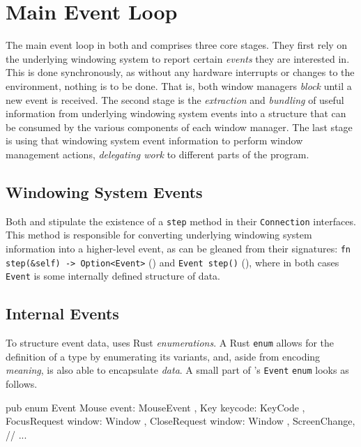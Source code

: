 \section{Main Event Loop}

The main event loop  in both \wmrs and \wmcpp comprises  three core stages. They
first rely on the underlying  windowing system to report certain \textit{events}
they are  interested in.  This is  done synchronously,  as without  any hardware
interrupts or changes to  the environment, nothing is to be  done. That is, both
window managers \textit{block}  until a new event is received.  The second stage
is  the \textit{extraction}  and  \textit{bundling} of  useful information  from
underlying windowing system events into a  structure that can be consumed by the
various  components  of each  window  manager.  The  last  stage is  using  that
windowing  system  event  information  to  perform  window  management  actions,
\textit{delegating work} to different parts of the program.

\subsection{Windowing System Events}

Both  \wmrs  and  \wmcpp  stipulate  the existence  of  a  \texttt{step}  method
in  their  \texttt{Connection}  interfaces.   This  method  is  responsible  for
converting underlying windowing system information into a higher-level event, as
can  be  gleaned  from  their signatures:  \texttt{fn  step(&self)  ->
Option<Event>}  (\wmrs) and  \texttt{Event step()}  (\wmcpp), where  in
both cases \texttt{Event} is some internally defined structure of data.

\subsection{Internal Events}


To  structure  event  data,  \wmrs   uses  Rust  \textit{enumerations}.  A  Rust
\texttt{enum}  allows for  the  definition of  a  type by  enumerating
its  variants,  and,   aside  from  encoding  \textit{meaning},   is  also  able
to  encapsulate   \textit{data}\cite{therustbook}.  A  small  part   of  \wmrs's
\texttt{Event} \texttt{enum} looks as follows.

\begin{rustblock}
  pub enum Event {
    Mouse { event: MouseEvent },
    Key { keycode: KeyCode },
    FocusRequest { window: Window },
    CloseRequest { window: Window },
    ScreenChange,
    // ...
  }
\end{rustblock}

